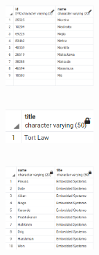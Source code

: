 \documentclass{article}
\begin{document}

\section{}
\subsection{}
\begin{figure}[ht]
    \centering
    \includegraphics[width=0.3\textwidth]{figures/5-a.png}
    \caption
	{
	}
    \label{fig:fig1}
\end{figure}

\subsection{}
\begin{figure}[ht]
    \centering
    \includegraphics[width=0.3\textwidth]{figures/5-b.png}
    \caption
	{
	}
    \label{fig:fig1}
\end{figure}

\subsection{}
\begin{figure}[ht]
    \centering
    \includegraphics[width=0.3\textwidth]{figures/5-c.png}
    \caption
	{
	}
    \label{fig:fig1}
\end{figure}
\end{document}
